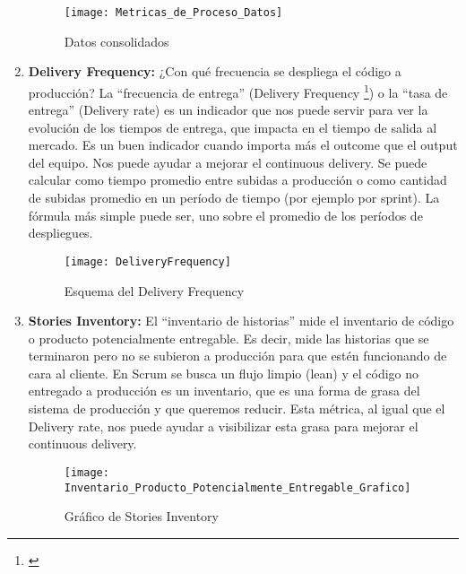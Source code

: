 \begin{enumerate}
  \begin{figure}[h]
  \centering
  \texttt{[image: Metricas\_de\_Proceso\_Datos]}
  \caption{Datos consolidados}
  \centering
  \label{fig:Metricas_de_Proceso_Datos} %
  \end{figure}
  \FloatBarrier

\item {\textbf{Delivery Frequency:} ¿Con qué frecuencia se despliega el código a producción? La “frecuencia de entrega” (Delivery Frequency \footnote{\cite{Humble-2018}}) o la “tasa de entrega” (Delivery rate) es un indicador que nos puede servir para ver la evolución de los tiempos de entrega, que impacta en el tiempo de salida al mercado. Es un buen indicador cuando importa más el outcome que el output del equipo. Nos puede ayudar a mejorar el continuous delivery. Se puede calcular como tiempo promedio entre subidas a producción o como cantidad de subidas promedio en un período de tiempo (por ejemplo por sprint). La fórmula más simple puede ser, uno sobre el promedio de los períodos de despliegues.
}

  \begin{figure}[h]
  \centering
  \texttt{[image: DeliveryFrequency]}
  \caption{Esquema del Delivery Frequency}
  \centering
  \label{fig:DeliveryFrequency} %
  \end{figure}
  \FloatBarrier
  
\item {\textbf{Stories Inventory:} El “inventario de historias” mide el inventario de código o producto potencialmente entregable. Es decir, mide las historias que se terminaron pero no se subieron a producción para que estén funcionando de cara al cliente. En Scrum se busca un flujo limpio (lean) y el código no entregado a producción es un inventario, que es una forma de grasa del sistema de producción y que queremos reducir. Esta métrica, al igual que el Delivery rate, nos puede ayudar a visibilizar esta grasa para mejorar el continuous delivery.
}

  \begin{figure}[h]
  \centering
  \texttt{[image: Inventario\_Producto\_Potencialmente\_Entregable\_Grafico]}
  \caption{Gráfico de Stories Inventory}
  \centering
  \label{fig:Inventario_Producto_Potencialmente_Entregable_Grafico} %
  \end{figure}
  \FloatBarrier


\end{enumerate}

